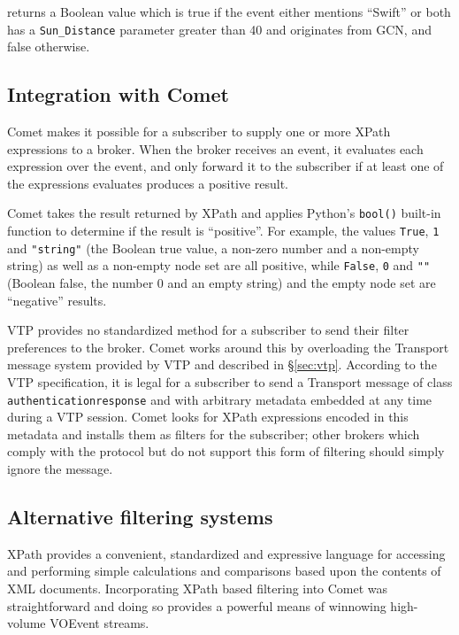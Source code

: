 \documentclass[5p,authoryear]{elsarticle}
\begin{document}
returns a Boolean value which is true if the event either mentions ``Swift''
or both has a \texttt{Sun\_Distance} parameter greater than 40 and originates
from GCN, and false otherwise.

\setcounter{listing}{\value{savelisting}}%
\endgroup
\subsection{Integration with Comet}

Comet makes it possible for a subscriber to supply one or more XPath
expressions to a broker. When the broker receives an event, it evaluates each
expression over the event, and only forward it to the subscriber if at least
one of the expressions evaluates produces a positive result.

Comet takes the result returned by XPath and applies Python's \texttt{bool()}
built-in function to determine if the result is ``positive''. For example, the
values \texttt{True}, \texttt{1} and \texttt{"string"} (the Boolean true
value, a non-zero number and a non-empty string) as well as a non-empty node
set are all positive, while \texttt{False}, \texttt{0} and \texttt{""}
(Boolean false, the number 0 and an empty string) and the empty node set are
``negative'' results.

VTP provides no standardized method for a subscriber to send their filter
preferences to the broker. Comet works around this by overloading the
Transport message system provided by VTP and described in \S\ref{sec:vtp}.
According to the VTP specification, it is legal for a subscriber to send a
Transport message of class \texttt{authenticationresponse} and with arbitrary
metadata embedded at any time during a VTP session. Comet looks for XPath
expressions encoded in this metadata and installs them as filters for the
subscriber; other brokers which comply with the protocol but do not support
this form of filtering should simply ignore the message.

\subsection{Alternative filtering systems}

XPath provides a convenient, standardized \citep{Clark:1999} and expressive
language for accessing and performing simple calculations and comparisons
based upon the contents of XML documents. Incorporating XPath based filtering
into Comet was straightforward and doing so provides a powerful means of
winnowing high-volume VOEvent streams.
\end{document}
